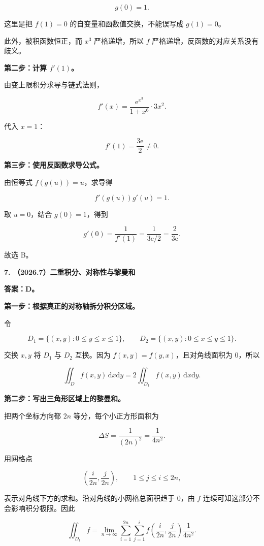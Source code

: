 \documentclass[UTF8,11pt,fontset=windows]{ctexart}
\begin{document}
$$
g(0)=1.
$$

这里是把 $f(1)=0$ 的自变量和函数值交换，不能误写成 $g(1)=0$。

此外，被积函数恒正，而 $x^3$ 严格递增，所以 $f$ 严格递增，反函数的对应关系没有歧义。

\textbf{第二步：计算 $f'(1)$。}

由变上限积分求导与链式法则，

$$
f'(x)=\frac{\mathrm{e}^{x^3}}{1+x^6}\cdot3x^2.
$$

代入 $x=1$：

$$
f'(1)=\frac{3\mathrm{e}}2\ne0.
$$

\textbf{第三步：使用反函数求导公式。}

由恒等式 $f(g(u))=u$，求导得

$$
f'(g(u))g'(u)=1.
$$

取 $u=0$，结合 $g(0)=1$，得到

$$
g'(0)=\frac1{f'(1)}=\frac1{3\mathrm{e}/2}
=\frac{2}{3\mathrm{e}}.
$$

故选 B。

\clearpage

\textbf{7. （2026.7）二重积分、对称性与黎曼和}

\textbf{答案：D。}

\textbf{第一步：根据真正的对称轴拆分积分区域。}

令

$$
D_1=\{(x,y):0\le y\le x\le1\},
\qquad
D_2=\{(x,y):0\le x\le y\le1\}.
$$

交换 $x,y$ 将 $D_1$ 与 $D_2$ 互换。因为 $f(x,y)=f(y,x)$，且对角线面积为 $0$，所以

$$
\iint_Df(x,y)\,\mathrm{d}x\mathrm{d}y
=2\iint_{D_1}f(x,y)\,\mathrm{d}x\mathrm{d}y.
$$

\textbf{第二步：写出三角形区域上的黎曼和。}

把两个坐标方向都 $2n$ 等分，每个小正方形面积为

$$
\Delta S=\frac1{(2n)^2}=\frac1{4n^2}.
$$

用网格点

$$
\left(\frac{i}{2n},\frac{j}{2n}\right),
\qquad 1\le j\le i\le2n,
$$

表示对角线下方的求和。沿对角线的小网格总面积趋于 $0$，由 $f$ 连续可知这部分不会影响积分极限。因此

$$
\iint_{D_1}f
=\lim_{n\to\infty}\sum_{i=1}^{2n}\sum_{j=1}^{i}
 f\left(\frac{i}{2n},\frac{j}{2n}\right)\frac1{4n^2}.
$$
\end{document}
